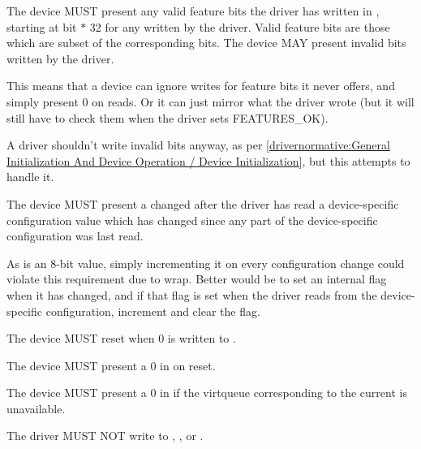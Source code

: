 The device MUST present any valid feature bits the driver has written in , starting at bit  $*$ 32 for any  written by the driver.  Valid feature bits are those which are subset of the corresponding  bits.  The device MAY present invalid bits written by the driver.

\begin{note}
  This means that a device can ignore writes for feature bits it never
  offers, and simply present 0 on reads.  Or it can just mirror what the driver wrote
  (but it will still have to check them when the driver sets FEATURES_OK).
\end{note}

\begin{note}
  A driver shouldn't write invalid bits anyway, as per \ref{drivernormative:General Initialization And Device Operation / Device Initialization}, but this attempts to handle it.
\end{note}

The device MUST present a changed  after the
driver has read a device-specific configuration value which has
changed since any part of the device-specific configuration was last
read.
\begin{note}
As  is an 8-bit value, simply incrementing it
on every configuration change could violate this requirement due to wrap.
Better would be to set an internal flag when it has changed,
and if that flag is set when the driver reads from the device-specific
configuration, increment  and clear the flag.
\end{note}

The device MUST reset when 0 is written to .

The device MUST present a 0 in  on reset.

The device MUST present a 0 in  if the virtqueue
corresponding to the current  is unavailable.


The driver MUST NOT write to , ,  or .

